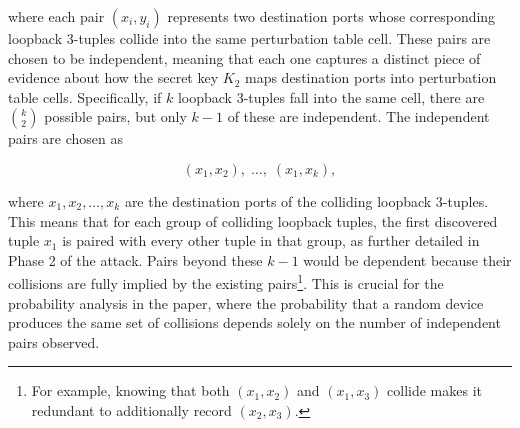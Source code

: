 \documentclass{report}
\begin{document}





where each pair $(x_i, y_i)$ represents \alert{two destination ports} whose corresponding loopback 3-tuples collide into the same perturbation table cell. These pairs are chosen to be \alert{independent}, meaning that each one captures a distinct piece of evidence about how the secret key $K_2$ maps destination ports into perturbation table cells. Specifically, if $k$ loopback 3-tuples fall into the same cell, there are $\binom{k}{2}$ possible pairs, but only $k-1$ of these are independent. The independent pairs are chosen as

\[
	(x_1, x_2),\; \ldots,\; (x_1, x_k),
\]

where $x_1, x_2, \ldots, x_k$ are the destination ports of the colliding loopback 3-tuples. This means that for each group of colliding loopback tuples, the first discovered tuple $x_1$ is paired with every other tuple in that group, as further detailed in Phase 2 of the attack. Pairs beyond these $k-1$ would be \alert{dependent} because their collisions are fully implied by the existing pairs\footnote{For example, knowing that both $(x_1, x_2)$ and $(x_1, x_3)$ collide makes it redundant to additionally record $(x_2, x_3)$.}. This is crucial for the probability analysis in the paper, where the probability that a random device produces the same set of collisions depends solely on the number of independent pairs observed.
\end{document}
